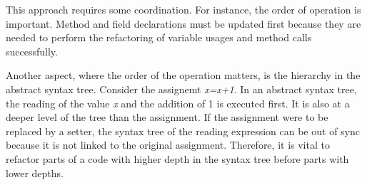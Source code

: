 This approach requires some coordination. For instance, the order of operation is important. Method and field declarations must be updated first because they are needed to perform the refactoring of variable usages and method calls successfully. 

Another aspect, where the order of the operation matters, is the hierarchy in the abstract syntax tree. Consider the assignemt \textit{x=x+1}. In an abstract syntax tree, the reading of the value \textit{x} and the addition of 1 is executed first. It is also at a deeper level of the tree than the assignment. If the assignment were to be replaced by a setter, the syntax tree of the reading expression can be out of sync because it is not linked to the original assignment. Therefore, it is vital to refactor parts of a code with higher depth in the syntax tree before parts with lower depths. 
